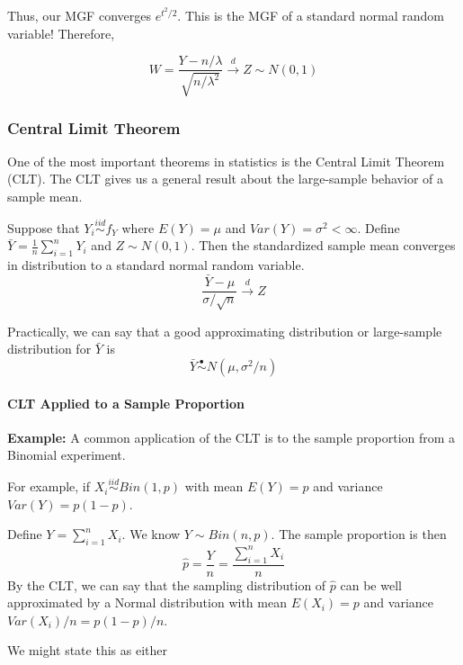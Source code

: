 \documentclass[
]{article}
\providecommand{\tightlist}{%
  \setlength{\itemsep}{0pt}\setlength{\parskip}{0pt}}
\begin{document}
Thus, our MGF converges \(e^{t^2/2}\). This is the MGF of a standard
normal random variable! Therefore,

\[W = \frac{Y-n/\lambda}{\sqrt{n/\lambda^2}}\stackrel{d}{\rightarrow} Z \sim N(0,1)\]

\hypertarget{central-limit-theorem}{%
\subsubsection{Central Limit Theorem}\label{central-limit-theorem}}

One of the most important theorems in statistics is the Central Limit
Theorem (CLT). The CLT gives us a general result about the large-sample
behavior of a sample mean.

\begin{description}
\tightlist
\item[Central Limit Theorem (CLT)]
Suppose that \(Y_i\stackrel{iid}\sim f_Y\) where \(E(Y)=\mu\) and
\(Var(Y)=\sigma^2 < \infty\). Define
\(\bar{Y}=\frac{1}{n} \sum_{i=1}^{n} Y_i\) and \(Z \sim N(0, 1)\). Then
the standardized sample mean converges in distribution to a standard
normal random variable.
\[\frac{\bar{Y}-\mu}{\sigma/\sqrt{n}} \stackrel {d} {\rightarrow} Z\]
\end{description}

Practically, we can say that a good approximating distribution or
large-sample distribution for \(\bar{Y}\) is
\[\bar{Y}\stackrel{\bullet}\sim N(\mu, \sigma^2/n)\]

\hypertarget{clt-applied-to-a-sample-proportion}{%
\paragraph{CLT Applied to a Sample
Proportion}\label{clt-applied-to-a-sample-proportion}}

\textbf{Example:} A common application of the CLT is to the sample
proportion from a Binomial experiment.

For example, if \(X_i\stackrel{iid}\sim Bin(1, p)\) with mean
\(E(Y) = p\) and variance \(Var(Y) = p(1-p)\).

Define \(Y = \sum_{i=1}^n X_i\). We know \(Y\sim Bin(n, p)\). The sample
proportion is then \[\hat{p}=\frac{Y}{n} = \frac{\sum_{i=1}^n X_i}{n}\]
By the CLT, we can say that the sampling distribution of \(\hat{p}\) can
be well approximated by a Normal distribution with mean \(E(X_i) = p\)
and variance \(Var(X_i)/n = p(1-p)/n\).

We might state this as either
\end{document}
